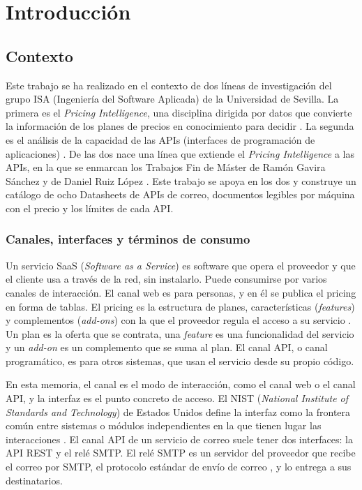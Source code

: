 \chapter{Introducción}
\label{cap:introduccion}

\section{Contexto}
\label{sec:introduccion:contexto}

Este trabajo se ha realizado en el contexto de dos líneas de investigación
del grupo ISA (Ingeniería del Software Aplicada) de la Universidad de
Sevilla. La primera es el \textit{Pricing Intelligence}, una disciplina
dirigida por datos que convierte la información de los planes de precios en
conocimiento para decidir \citep{cavero2026pricingintelligence}. La segunda
es el análisis de la capacidad de las APIs (interfaces de programación de
aplicaciones) \citep{ruizcortes2025cajanegra}.
De las dos nace una línea que extiende el \textit{Pricing Intelligence} a las
APIs, en la que se enmarcan los Trabajos Fin de Máster de Ramón Gavira
Sánchez \citep{gavira2026tfm} y de Daniel Ruiz López \citep{ruizlopez2026tfm}. Este trabajo
se apoya en los dos y construye un catálogo de ocho Datasheets de APIs de
correo, documentos legibles por máquina con el precio y los límites de cada
API.

\subsection{Canales, interfaces y términos de consumo}
\label{subsec:introduccion:canales}

Un servicio SaaS (\textit{Software as a Service}) es software que opera el
proveedor y que el cliente usa a través de la red, sin instalarlo. Puede
consumirse por varios canales de interacción. El canal web es para personas,
y en él se publica el pricing en forma de tablas. El pricing es la estructura
de planes, características (\textit{features}) y complementos
(\textit{add-ons}) con la que el proveedor regula el acceso a su servicio
\citep{garciafernandez2025ipricing}. Un plan es la oferta que se contrata, una
\textit{feature} es una funcionalidad del servicio y un \textit{add-on} es un
complemento que se suma al plan. El canal API, o canal programático, es para
otros sistemas, que usan el servicio desde su propio código.

En esta memoria, el canal es el modo de interacción, como el canal web o el
canal API, y la interfaz es el punto concreto de acceso. El NIST
(\textit{National Institute of Standards and Technology}) de Estados Unidos
define la interfaz como la frontera común entre sistemas o módulos
independientes en la que tienen lugar las interacciones \citep{nist80053r5}.
El canal API de un servicio de correo suele tener dos
interfaces: la API REST y el relé SMTP. El relé SMTP es un servidor del
proveedor que recibe el correo por SMTP, el protocolo estándar de envío de
correo \citep{rfc5321}, y lo entrega a sus destinatarios.


